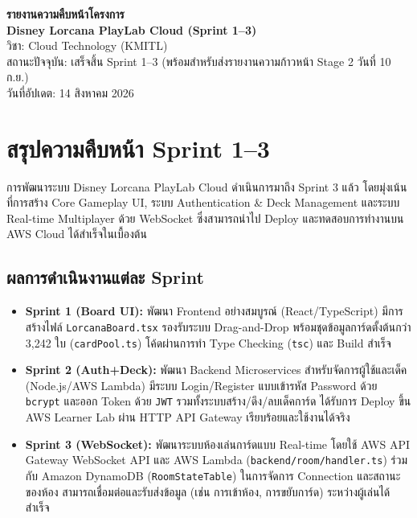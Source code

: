 \documentclass[12pt,a4paper]{article}
\begin{document}
\begin{center}
{\LARGE\bfseries รายงานความคืบหน้าโครงการ\\[2pt]
Disney Lorcana PlayLab Cloud (Sprint 1--3)}\\[10pt]
{\large วิชา: Cloud Technology (KMITL)}\\[4pt]
สถานะปัจจุบัน: เสร็จสิ้น Sprint 1--3 (พร้อมสำหรับส่งรายงานความก้าวหน้า Stage 2 วันที่ 10 ก.ย.)\\[4pt]
วันที่อัปเดต: 14 สิงหาคม 2026
\end{center}

\vspace{12pt}

\section{สรุปความคืบหน้า Sprint 1--3}

การพัฒนาระบบ Disney Lorcana PlayLab Cloud ดำเนินการมาถึง Sprint 3 แล้ว โดยมุ่งเน้นที่การสร้าง Core Gameplay UI, ระบบ Authentication \& Deck Management และระบบ Real-time Multiplayer ด้วย WebSocket ซึ่งสามารถนำไป Deploy และทดสอบการทำงานบน AWS Cloud ได้สำเร็จในเบื้องต้น

\subsection{ผลการดำเนินงานแต่ละ Sprint}

\begin{itemize}[leftmargin=1.5em, itemsep=3pt]
  \item \textbf{Sprint 1 (Board UI):} พัฒนา Frontend อย่างสมบูรณ์ (React/TypeScript) มีการสร้างไฟล์ \texttt{LorcanaBoard.tsx} รองรับระบบ Drag-and-Drop พร้อมชุดข้อมูลการ์ดตั้งต้นกว่า 3,242 ใบ (\texttt{cardPool.ts}) โค้ดผ่านการทำ Type Checking (\texttt{tsc}) และ Build สำเร็จ
  \item \textbf{Sprint 2 (Auth+Deck):} พัฒนา Backend Microservices สำหรับจัดการผู้ใช้และเด็ค (Node.js/AWS Lambda) มีระบบ Login/Register แบบเข้ารหัส Password ด้วย \texttt{bcrypt} และออก Token ด้วย \texttt{JWT} รวมทั้งระบบสร้าง/ดึง/ลบเด็คการ์ด ได้รับการ Deploy ขึ้น AWS Learner Lab ผ่าน HTTP API Gateway เรียบร้อยและใช้งานได้จริง
  \item \textbf{Sprint 3 (WebSocket):} พัฒนาระบบห้องเล่นการ์ดแบบ Real-time โดยใช้ AWS API Gateway WebSocket API และ AWS Lambda (\texttt{backend/room/handler.ts}) ร่วมกับ Amazon DynamoDB (\texttt{RoomStateTable}) ในการจัดการ Connection และสถานะของห้อง สามารถเชื่อมต่อและรับส่งข้อมูล (เช่น การเข้าห้อง, การขยับการ์ด) ระหว่างผู้เล่นได้สำเร็จ
\end{itemize}
\end{document}
